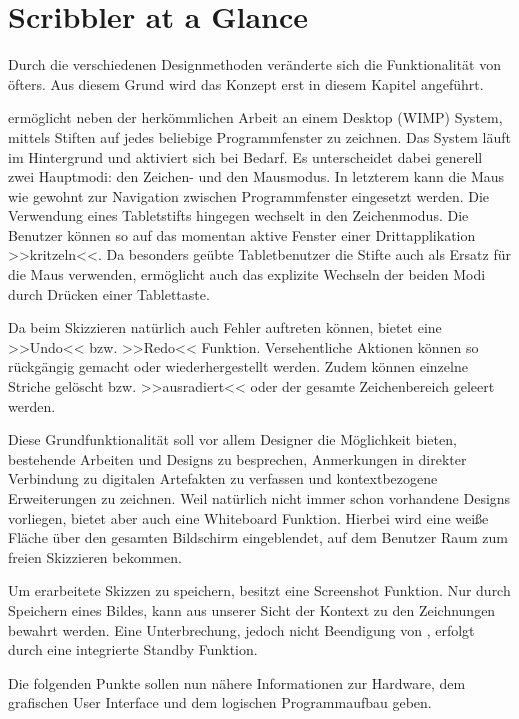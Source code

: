 \section{Scribbler at a Glance} 
Durch die verschiedenen Designmethoden veränderte sich die Funktionalität von \scribbler öfters. Aus diesem Grund wird das Konzept erst in diesem Kapitel angeführt.

\medskip \scribbler ermöglicht neben der herkömmlichen Arbeit an einem Desktop (\acs{WIMP}) System, mittels Stiften auf jedes beliebige Programmfenster zu zeichnen. Das System läuft im Hintergrund und aktiviert sich bei Bedarf. Es unterscheidet dabei generell zwei Hauptmodi: den Zeichen- und den Mausmodus. In letzterem kann die Maus wie gewohnt zur Navigation zwischen Programmfenster eingesetzt werden. Die Verwendung eines Tabletstifts hingegen wechselt in den Zeichenmodus. Die Benutzer können so auf das momentan aktive Fenster einer Drittapplikation >>kritzeln<<. Da besonders geübte Tabletbenutzer die Stifte auch als Ersatz für die Maus verwenden, ermöglicht \scribbler auch das explizite Wechseln der beiden Modi durch Drücken einer Tablettaste.

\medskip Da beim Skizzieren natürlich auch Fehler auftreten können, bietet \scribbler eine >>Undo<< bzw. >>Redo<< Funktion. Versehentliche Aktionen können so rückgängig gemacht oder wiederhergestellt werden. Zudem können einzelne Striche gelöscht bzw. >>ausradiert<< oder der gesamte Zeichenbereich geleert werden.

\medskip Diese Grundfunktionalität soll vor allem Designer die Möglichkeit bieten, bestehende Arbeiten und Designs zu besprechen, Anmerkungen in direkter Verbindung zu digitalen Artefakten zu verfassen und kontextbezogene Erweiterungen zu zeichnen. Weil natürlich nicht immer schon vorhandene Designs vorliegen, bietet \scribbler aber auch eine Whiteboard Funktion. Hierbei wird eine weiße Fläche über den gesamten Bildschirm eingeblendet, auf dem Benutzer Raum zum freien Skizzieren bekommen.

\medskip Um erarbeitete Skizzen zu speichern, besitzt \scribbler eine Screenshot Funktion. Nur durch Speichern eines Bildes, kann aus unserer Sicht der Kontext zu den Zeichnungen bewahrt werden. Eine Unterbrechung, jedoch nicht Beendigung von \scribbler, erfolgt durch eine integrierte Standby Funktion.

\medskip Die folgenden Punkte sollen nun nähere Informationen zur Hardware, dem grafischen User Interface und dem logischen Programmaufbau geben. 


